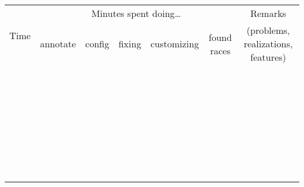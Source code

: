 \documentclass{article}
\begin{document}
\newcommand\asdf[1]{\hspace{-0.05in}\small{#1}\hspace{-0.05in}}
\begin{center}
\begin{tabular}{|c||c|c|c|c|c||c|}
	\hline
	\multirow{2}{*}{Time} & \multicolumn{5}{|c||}{Minutes spent doing\dots} & Remarks \\
	\cline{2-7}
	& \asdf{annotate} & \asdf{config} & \asdf{fixing} & \asdf{customizing} & \asdf{found races} & \hspace{0.7in} (problems, realizations, features) \hspace{0.7in} \\
	\hline \hline
	& & & & & & \\
	& & & & & & \\
	& & & & & & \\
	\hline
	& & & & & & \\
	& & & & & & \\
	& & & & & & \\
	\hline
	& & & & & & \\
	& & & & & & \\
	& & & & & & \\
	\hline
	& & & & & & \\
	& & & & & & \\
	& & & & & & \\
	\hline
	& & & & & & \\
	& & & & & & \\
	& & & & & & \\
	\hline
	& & & & & & \\
	& & & & & & \\
	& & & & & & \\
	\hline
	& & & & & & \\
	& & & & & & \\
	& & & & & & \\
	\hline
	& & & & & & \\
	& & & & & & \\
	& & & & & & \\
	\hline
	& & & & & & \\
	& & & & & & \\
	& & & & & & \\
	\hline
	& & & & & & \\
	& & & & & & \\
	& & & & & & \\
	\hline
	& & & & & & \\
	& & & & & & \\
	& & & & & & \\
	\hline
\end{tabular}
\end{center}
\end{document}
